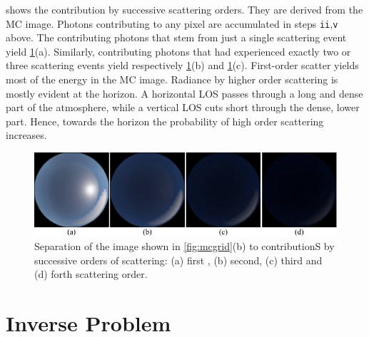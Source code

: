 \documentclass[10pt,letterpaper]{article}
\newcommand{\yoavcomment}[1]{}
\renewcommand{\yoavcomment}[1]{#1} %
\begin{document}
 shows the contribution by successive
scattering orders. They are derived from the MC image. Photons contributing
to any pixel are accumulated in steps {\tt ii},{\tt v} above.
The contributing photons that stem from just a single scattering event yield \cref{fig:scatter_order}(a). Similarly, contributing photons that had experienced exactly  two or three scattering events yield respectively \cref{fig:scatter_order}(b) and
\cref{fig:scatter_order}(c). First-order scatter yields
most of the energy in the MC image. Radiance by higher order scattering
is mostly evident at the horizon. A horizontal LOS passes through a long and dense part of the atmosphere, while a vertical LOS cuts short through the dense, lower part. Hence,
towards the horizon the probability of high order scattering increases.
\begin{figure}[bt]
  \centering
  \yoavcomment{\includegraphics{images/scatter_order.pdf}}
  \caption{\small Separation of the image shown in \cref{fig:mcgrid}(b) to contributionS
   by successive orders of scattering: (a) first , (b) second, (c) third and (d) forth scattering order.}
  \label{fig:scatter_order}
\end{figure}


\section{Inverse Problem}
\label{sec:inverse-problem}
\end{document}

